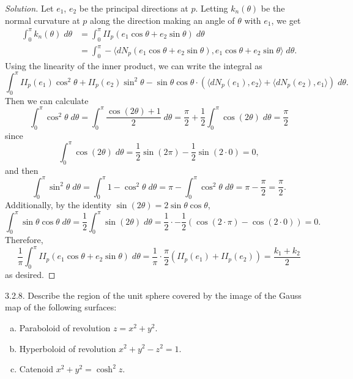 \documentclass[10pt]{scrartcl}
\providecommand{\half}{\frac{1}{2}}
\providecommand{\ii}{\item}
\providecommand{\dif}{\;d}
\newenvironment{soln}{\begin{proof}[Solution]}{\end{proof}}
\begin{document}
\begin{soln}
	Let $e_1$, $e_2$ be the principal directions at $p$.
	Letting $k_n(\theta)$ be the normal curvature at $p$
	along the direction making an angle of $\theta$ with $e_1$, we get
	\begin{align*}
		\int_0^\pi k_n(\theta)\dif\theta
		&= \int_0^\pi II_p(e_1\cos\theta + e_2\sin\theta)\dif\theta\\
		&= \int_0^\pi -\langle dN_p(e_1\cos\theta + e_2\sin\theta),
		e_1\cos\theta+e_2\sin\theta\rangle \dif\theta.
	\end{align*}
	Using the linearity of the inner product, we can write the integral as
	\[\int_0^\pi II_p(e_1)\cos^2\theta + II_p(e_2)\sin^2\theta
	- \sin\theta\cos\theta\cdot
	(\langle dN_p(e_1), e_2\rangle + \langle dN_p(e_2), e_1\rangle)\dif\theta.\]
	Then we can calculate
	\[\int_0^\pi \cos^2\theta\dif\theta =
	\int_0^\pi \frac{\cos(2\theta)+1}{2}\dif\theta
	= \frac\pi2 + \half\int_0^\pi\cos(2\theta)\dif\theta = \frac\pi2\]
	since
	\[\int_0^\pi\cos(2\theta)\dif\theta
	= \half\sin(2\pi) - \half\sin(2\cdot 0) = 0,\]
	and then
	\[\int_0^\pi \sin^2\theta\dif\theta
	= \int_0^\pi 1-\cos^2\theta\dif\theta
	= \pi - \int_0^\pi\cos^2\theta\dif\theta
	= \pi-\frac\pi2 = \frac\pi2.\]
	Additionally, by the identity $\sin(2\theta)=2\sin\theta\cos\theta$,
	\[\int_0^\pi\sin\theta\cos\theta\dif\theta
	= \half \int_0^\pi \sin(2\theta)\dif\theta
	= \half\cdot -\half(\cos(2\cdot\pi) - \cos(2\cdot 0)) = 0.\]
	Therefore,
	\[\frac1\pi\int_0^\pi II_p(e_1\cos\theta+e_2\sin\theta)\dif\theta
	= \frac1\pi\cdot\frac\pi2(II_p(e_1) + II_p(e_2))
	= \frac{k_1+k_2}{2}\]
	as desired.
\end{soln}

\begin{problem*}3.2.8.
	Describe the region of the unit sphere covered by the image
	of the Gauss map of the following surfaces:
	\begin{enumerate}[(a)]
		\ii Paraboloid of revolution $z=x^2+y^2$.
		\ii Hyperboloid of revolution $x^2+y^2-z^2=1$.
		\ii Catenoid $x^2+y^2=\cosh^2z$.
	\end{enumerate}
\end{problem*}
\end{document}
